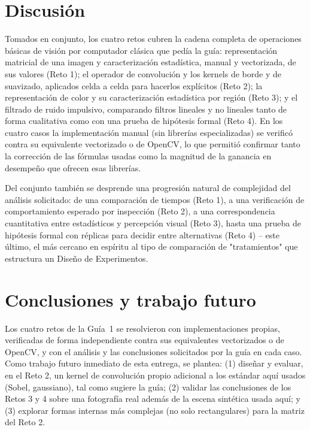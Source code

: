 \documentclass[11pt]{article}
\begin{document}
\section{Discusión}
Tomados en conjunto, los cuatro retos cubren la cadena completa de
operaciones básicas de visión por computador clásica que pedía la
guía: representación matricial de una imagen y caracterización
estadística, manual y vectorizada, de sus valores (Reto 1); el operador de
convolución y los kernels de borde y de suavizado, aplicados celda a celda
para hacerlos explícitos (Reto 2); la representación de color y su
caracterización estadística por región (Reto 3); y el filtrado de ruido
impulsivo, comparando filtros lineales y no lineales tanto de forma
cualitativa como con una prueba de hipótesis formal (Reto 4). En los cuatro
casos la implementación manual (sin librerías especializadas) se verificó
contra su equivalente vectorizado o de OpenCV, lo que permitió confirmar
tanto la corrección de las fórmulas usadas como la magnitud de la ganancia
en desempeño que ofrecen esas librerías.

Del conjunto también se desprende una progresión natural de complejidad
del análisis solicitado: de una comparación de tiempos (Reto 1), a una
verificación de comportamiento esperado por inspección (Reto 2), a una
correspondencia cuantitativa entre estadísticos y percepción visual
(Reto 3), hasta una prueba de hipótesis formal con réplicas para decidir
entre alternativas (Reto 4) -- este último, el más cercano en espíritu al
tipo de comparación de "tratamientos" que estructura un Diseño de
Experimentos.

\section{Conclusiones y trabajo futuro}
\label{sec:conclusiones}
Los cuatro retos de la Guía~1 se resolvieron con implementaciones propias,
verificadas de forma independiente contra sus equivalentes vectorizados o
de OpenCV, y con el análisis y las conclusiones solicitados por la guía en
cada caso. Como trabajo futuro inmediato de esta entrega, se plantea: (1)
diseñar y evaluar, en el Reto 2, un kernel de convolución propio adicional
a los estándar aquí usados (Sobel, gaussiano), tal como sugiere la guía;
(2) validar las conclusiones de los Retos 3 y 4 sobre una fotografía real
además de la escena sintética usada aquí; y (3) explorar formas internas
más complejas (no solo rectangulares) para la matriz del Reto 2.
\end{document}
